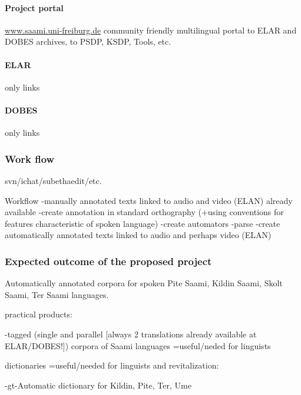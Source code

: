 \documentclass[a4paper,12pt]{article}
\begin{document}
\paragraph{Project portal} \url{www.saami.uni-freiburg.de} community friendly multilingual portal to ELAR and DOBES archives, to PSDP, KSDP, Tools, etc. 

\paragraph{ELAR} only links

\paragraph{DOBES} only links

\subsubsection{Work flow}
svn/ichat/subethaedit/etc.

Workflow
-manually annotated texts linked to audio and video (ELAN) already available
-create annotation in standard orthography (+using conventions for features characteristic of spoken language)
-create automators
-parse
-create automatically annotated texts linked to audio and perhaps video (ELAN)


\subsubsection{Expected outcome of the proposed project}
Automatically annotated corpora for spoken Pite Saami, Kildin Saami, Skolt Saami, Ter Saami languages.

practical products:

-tagged (single and parallel [always 2 translations already available at ELAR/DOBES!]) corpora of Saami languages =useful/neded for linguists

dictionaries =useful/needed for linguists and revitalization:

-gt-Automatic dictionary for Kildin, Pite, Ter, Ume
\end{document}
